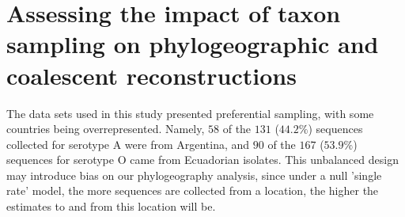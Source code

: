 \documentclass[a4paper,10pt]{article}
\begin{document}
\section{Assessing the impact of taxon sampling on phylogeographic and coalescent reconstructions}

The data sets used in this study presented preferential sampling, with some countries being overrepresented.
Namely, $58$ of the $131$ ($44.2\%$) sequences collected for serotype A were from Argentina, and $90$ of the $167$ ($53.9\%$) sequences for serotype O came from Ecuadorian isolates.
This unbalanced design may introduce bias on our phylogeography analysis, since under a null 'single rate' model, the more sequences are collected from a location, the higher the estimates to and from this location will be. %
\end{document}
